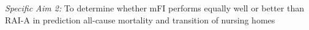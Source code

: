 \emph{Specific Aim 2:} To determine whether mFI performs equally well or better than RAI-A in prediction all-cause mortality and transition of nursing homes